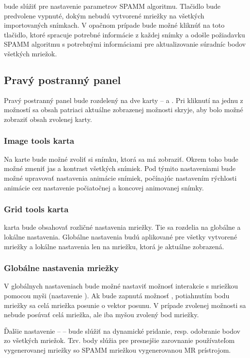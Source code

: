  bude slúžiť pre nastavenie parametrov SPAMM algoritmu. Tlačidlo  bude predvolene vypnuté, dokým nebudú vytvorené mriežky na všetkých importovaných snímkach. V opačnom prípade bude možné kliknúť na toto tlačidlo, ktoré spracuje potrebné informácie z každej snímky a odošle požiadavku SPAMM algoritmu s potrebnými informáciami pre aktualizovanie súradníc bodov všetkých mriežok.

\clearpage

\subsection {Pravý postranný panel}
Pravý postranný panel bude rozdelený na dve karty --  a . Pri kliknutí na jednu z možností sa obsah patriaci aktuálne zobrazenej možnosti skryje, aby bolo možné zobraziť obsah zvolenej karty.

\subsubsection {Image tools karta}
Na  karte bude možné zvoliť si snímku, ktorá sa má zobraziť. Okrem toho bude možné zmeniť jas a kontrast všetkých snímiek. Pod týmito nastaveniami bude možné upravovať nastavenia animácie snímiek, počínajúc nastavením rýchlosti animácie cez nastavenie počiatočnej a koncovej animovanej snímky.

\subsubsection {Grid tools karta}
 karta bude obsahovať rozličné nastavenia mriežky. Tie sa rozdelia na globálne a lokálne nastavenia. Globálne nastavenia budú aplikované pre všetky vytvorené mriežky a lokálne nastavenia len na mriežku, ktorá je aktuálne zobrazená.

\subsubsection*{Globálne nastavenia mriežky}
V globálnych nastaveniach bude možné nastaviť možnosť interakcie s mriežkou pomocou myši (nastavenie ). Ak bude zapnutá možnosť , potiahnutím bodu mriežky sa celá mriežka posunie o vektor posunu. V prípade zvolenej možnosti  sa nebude posúvať celá mriežka, ale iba myšou zvolený bod mriežky.

Ďalšie nastavenie --  -- bude slúžiť na dynamické pridanie, resp. odobranie  bodov zo všetkých mriežok. Tzv.  body slúžia pre presnejšie zarovnanie používateľom vygenerovanej mriežky so SPAMM mriežkou vygenerovanou MR prístrojom.

